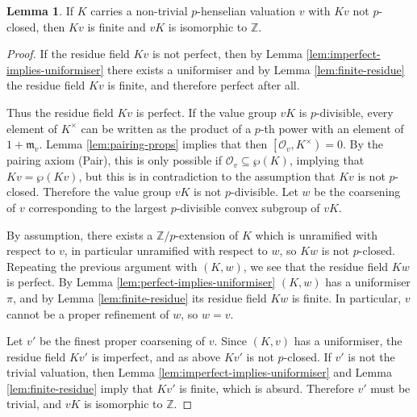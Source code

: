 \documentclass[a4paper, british, oneside]{amsart}
\newcommand{\Z}{\mathbb{Z}}
\newcommand{\pair}[2]{\left[{#1}, {#2}\right)}
\theoremstyle{definition}
\newtheorem{lemma}[theorem]{Lemma}
\theoremstyle{remark}
\begin{document}
\begin{lemma}\label{lem:discrete}
  If $K$ carries a non-trivial $p$-henselian valuation $v$ with $Kv$ not $p$-closed,
  then $Kv$ is finite and $vK$ is isomorphic to $\Z$.
\end{lemma}
\begin{proof}
  If the residue field $Kv$ is not perfect,
  then by Lemma \ref{lem:imperfect-implies-uniformiser} there exists a uniformiser
  and by Lemma \ref{lem:finite-residue} the residue field $Kv$ is finite,
  and therefore perfect after all.

  Thus the residue field $Kv$ is perfect.
  If the value group $vK$ is $p$-divisible, every element of $K^\times$ can be written as
  the product of a $p$-th power with an element of $1 + \mathfrak{m}_v$.
  Lemma \ref{lem:pairing-props} implies that then $\pair{\mathcal{O}_v}{K^\times} = 0$.
  By the pairing axiom (Pair), this is only possible if $\mathcal{O}_v \subseteq \wp(K)$,
  implying that $Kv = \wp(Kv)$,
  but this is in contradiction to the assumption that $Kv$ is not $p$-closed.
  Therefore the value group $vK$ is not $p$-divisible.
  Let $w$ be the coarsening of $v$ corresponding to the largest $p$-divisible convex subgroup of $vK$.

  By assumption, there exists a $\Z/p$-extension of $K$ which is unramified with respect to $v$,
  in particular unramified with respect to $w$,
  so $Kw$ is not $p$-closed.
  Repeating the previous argument with $(K,w)$,
  we see that the residue field $Kw$ is perfect.
  By Lemma \ref{lem:perfect-implies-uniformiser}
  $(K,w)$ has a uniformiser $\pi$,
  and by Lemma \ref{lem:finite-residue} its residue field $Kw$ is finite.
  In particular, $v$ cannot be a proper refinement of $w$, so $w = v$.
  
  Let $v'$ be the finest proper coarsening of $v$.
  Since $(K,v)$ has a uniformiser, the residue field $Kv'$ is imperfect,
  and as above $Kv'$ is not $p$-closed.
  If $v'$ is not the trivial valuation,
  then Lemma \ref{lem:imperfect-implies-uniformiser} and Lemma \ref{lem:finite-residue}
  imply that $Kv'$ is finite, which is absurd.
  Therefore $v'$ must be trivial, and $vK$ is isomorphic to $\Z$.
\end{proof}
\end{document}

